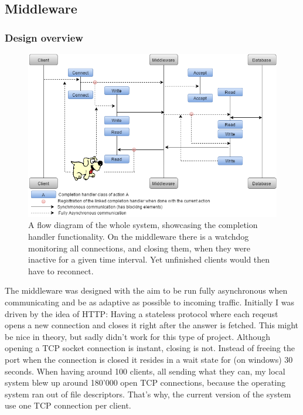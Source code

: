 \documentclass[11pt]{article}
\begin{document}
\subsection{Middleware}\label{sec:middleware}

\subsubsection{Design overview}\label{sec:design-overview}
\begin{figure}[!htb]
\centering
\includegraphics[width=1.0\linewidth, height=0.5\linewidth]{figures/middleware/mw_design}
\caption{A flow diagram of the whole system, showcasing the completion handler functionality. On the middleware there is a watchdog monitoring all connections, and closing them, when they were inactive for a given time interval. Yet unfinished clients would then have to reconnect.}
\label{fig:mw_design}
\end{figure}
The middleware was designed with the aim to be run fully asynchronous when communicating and be as adaptive as possible to incoming traffic. Initially I was driven by the idea of HTTP: Having a stateless protocol where each reqeust opens a new connection and closes it right after the answer is fetched. This might be nice in theory, but sadly didn't work for this type of project. Although opening a TCP socket connection is instant, closing is not. Instead of freeing the port when the connection is closed it resides in a wait state for (on windows) 30 seconds. When having around 100 clients, all sending what they can, my local system blew up around 180'000 open TCP connections, because the operating system ran out of file descriptors. That's why, the current version of the system use one TCP connection per client.
\end{document}
